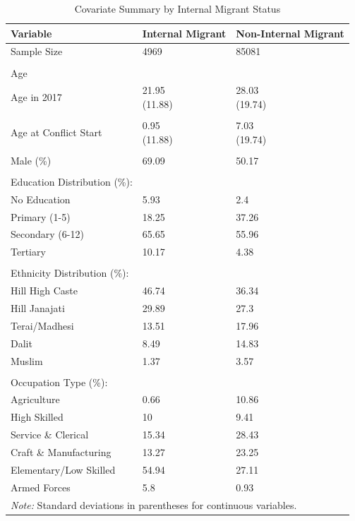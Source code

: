 \begin{table}[!h]
\centering
\caption{\label{tab:internal_migrant_summary}Covariate Summary by Internal Migrant Status}
\centering
\fontsize{10}{12}\selectfont
\begin{tabular}[t]{lll}
\toprule
Variable & Internal Migrant & Non-Internal Migrant\\
\midrule
Sample Size & 4969 & 85081\\
 &  & \\
Age &  & \\
Age in 2017 & \makecell[l]{21.95 \\ (11.88)} & \makecell[l]{28.03 \\ (19.74)}\\
 &  & \\
\addlinespace
Age at Conflict Start & \makecell[l]{0.95 \\ (11.88)} & \makecell[l]{7.03 \\ (19.74)}\\
 &  & \\
Male (\%) & 69.09 & 50.17\\
 &  & \\
Education Distribution (\%): &  & \\
\addlinespace
No Education & 5.93 & 2.4\\
Primary (1-5) & 18.25 & 37.26\\
Secondary (6-12) & 65.65 & 55.96\\
Tertiary & 10.17 & 4.38\\
 &  & \\
\addlinespace
Ethnicity Distribution (\%): &  & \\
Hill High Caste & 46.74 & 36.34\\
Hill Janajati & 29.89 & 27.3\\
Terai/Madhesi & 13.51 & 17.96\\
Dalit & 8.49 & 14.83\\
\addlinespace
Muslim & 1.37 & 3.57\\
 &  & \\
Occupation Type (\%): &  & \\
Agriculture & 0.66 & 10.86\\
High Skilled & 10 & 9.41\\
\addlinespace
Service \& Clerical & 15.34 & 28.43\\
Craft \& Manufacturing & 13.27 & 23.25\\
Elementary/Low Skilled & 54.94 & 27.11\\
Armed Forces & 5.8 & 0.93\\
\bottomrule
\multicolumn{3}{l}{\rule{0pt}{1em}\textit{Note: } Standard deviations in parentheses for continuous variables.}\\
\end{tabular}
\end{table}
